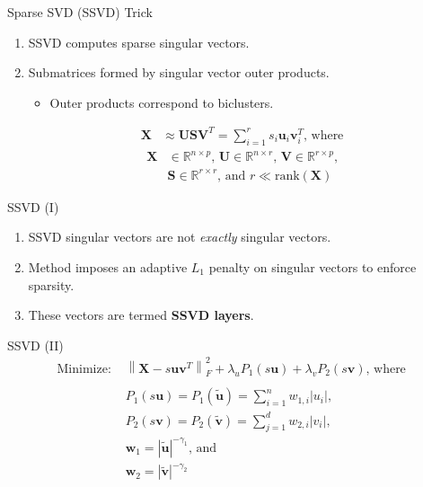 \documentclass{beamer}
\newcommand{\norm}[1]{\left\lVert#1\right\rVert}
\begin{document}
\begin{frame}{Sparse SVD (SSVD) Trick}
  \begin{enumerate}
    \item SSVD computes sparse singular vectors.
    \item Submatrices formed by singular vector outer products.
      \begin{itemize}
        \item Outer products correspond to biclusters.
      \end{itemize}
    \begin{align*}
      \textbf{X} &\approx \textbf{U}\textbf{S}\textbf{V}^T = \sum_{i=1}^r s_i \textbf{u}_i\textbf{v}_i^T\textrm{, where }
    \end{align*}
    \begin{align*}
      \textbf{X} &\in \mathbb{R}^{n \times p}\textrm{, } \textbf{U} \in \mathbb{R}^{n \times r}\textrm{, } \textbf{V} \in \mathbb{R}^{r \times p}\textrm{, } \\
      &\textbf{S} \in \mathbb{R}^{r \times r}\textrm{, and } r \ll \textrm{rank}(\textbf{X})
    \end{align*}
  \end{enumerate}
\end{frame}

\begin{frame}{SSVD (I)}
  \begin{enumerate}
    \item SSVD singular vectors are not \textit{exactly} singular vectors.
    \item Method imposes an adaptive $L_1$ penalty on singular vectors to
      enforce sparsity.
    \item These vectors are termed \textbf{SSVD layers}.
  \end{enumerate}
\end{frame}

\begin{frame}{SSVD (II)}
  \begin{align*}
    \textrm{Minimize: }&\norm{\textbf{X} - s\textbf{u}\textbf{v}^T}_F^2 + \lambda_u P_1(s\textbf{u}) + \lambda_v P_2(s\textbf{v})\textrm{, where } \\
    \\
    &P_1(s\textbf{u}) = P_1(\tilde{\textbf{u}}) = \sum_{i=1}^n w_{1,i} |u_i|\textrm{, } \\
    &P_2(s\textbf{v}) = P_2(\tilde{\textbf{v}}) = \sum_{j=1}^d w_{2,i} |v_i|\textrm{, } \\
    &\textbf{w}_1 = |\tilde{\textbf{u}}|^{-\gamma_1}\textrm{, and } \\
    &\textbf{w}_2 = |\tilde{\textbf{v}}|^{-\gamma_2}
  \end{align*}
\end{frame}
\end{document}
